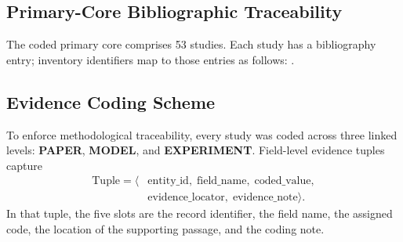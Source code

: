 \documentclass[lettersize,journal]{IEEEtran}
\begin{document}
\subsection{Primary-Core Bibliographic Traceability}
The coded primary core comprises 53 studies. Each study has a bibliography entry; inventory identifiers map to those entries as follows: \cite{KT004_GKT_2019,KT010_GIKT_2021,KT011_BiCLKT_2022,KT012_JKT_2021,KT014_PDKTC_2018,KT016_SKT_2020,KT023_SGKT_2022,KT026_PretrainQ_2020,KT029_DGEKT_2024,KT031_KSGAKT_2022,KT033_DGMN_2023,KT035_HHSKT_2023,KT036_TSKT_2024,KT037_CMKT_2022,KT038_DyGKT_2024} \cite{KT039_CL4KT_2022,KT042_S2HHN_2023,KT043_3VCLKT_2024,KT044_SINKT_2024,KT047_DCSSL_2023,KT050_GraphCA_2023,KT052_CapsuleGNN_2022,KT053_GASKT_2021,KT056_LSTGraph_2025,KT060_STHKT_2025,KT062_LGSKT_2025,KT063_MAHKT_2025,KT064_MGEnsemble_2025,KT065_CSGKT_2025,KT066_HyperKT_2025} \cite{KT067_SKMGKT_2025,KT068_HKT_2025,KT069_AEGOTCDKT_2025,KT070_Coda_2025,KT076_KGNNKT_2025,KT077_R2GCurL_2026,KT079_STGSKT_2026,DECKT_2025,Han_KTDeeper_2024,HCMKT_2026,CoSKT_2024,DTransformer_2023,SPCLKT_2024,CLBG_2025,KT090_AGKT_2022} \cite{KT091_ExpertGraphs_2024,KT092_GRKT_2024,KT093_BiCo_2024,KT094_GCLFKT_2025,KT095_TransKT_2025,KT096_SCDI_2025,KT097_MSCL_2026,KT098_KGSKT_2025}.
\subsection{Evidence Coding Scheme}
To enforce methodological traceability, every study was coded across three linked levels: \textbf{PAPER}, \textbf{MODEL}, and \textbf{EXPERIMENT}. Field-level evidence tuples capture
\begin{equation}
\begin{aligned}
\text{Tuple} = \langle &\text{entity\_id},\; \text{field\_name},\; \text{coded\_value},\\
&\text{evidence\_locator},\; \text{evidence\_note} \rangle.
\end{aligned}
\end{equation}
In that tuple, the five slots are the record identifier, the field name, the assigned code, the location of the supporting passage, and the coding note.
\end{document}
